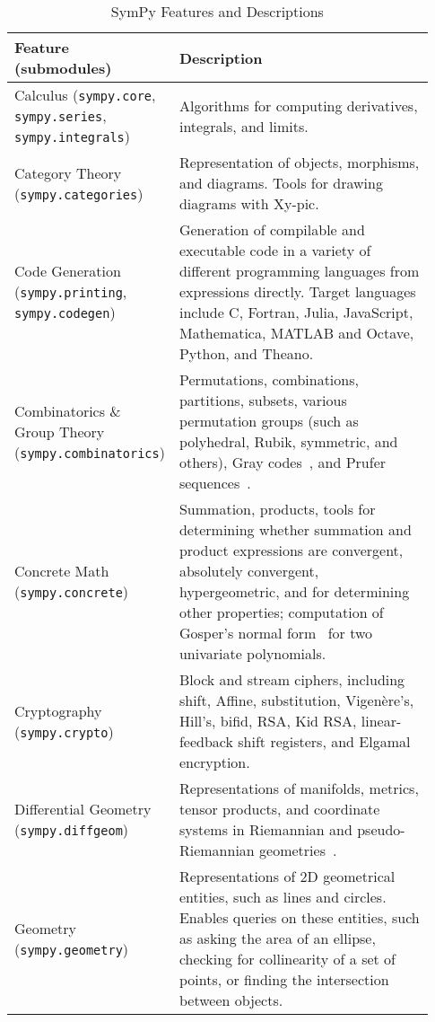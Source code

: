\begin{longtable}[htbc]{>{\raggedright}p{0.30\linewidth}p{0.63\linewidth}}
\caption{SymPy Features and Descriptions\label{features-table}}\\
\toprule
\textbf{Feature (submodules)} & \textbf{Description} \\
\midrule
Calculus (\texttt{sympy.core}, \texttt{sympy.series}, \texttt{sympy.integrals}) & Algorithms for computing derivatives, integrals, and limits.\\

Category Theory (\texttt{sympy.categories}) & Representation of objects, morphisms, and diagrams. Tools
for drawing diagrams with Xy-pic.\\

Code Generation (\texttt{sympy.printing}, \texttt{sympy.codegen}) & Generation of compilable and executable code in a
variety of different programming languages from expressions directly. Target
languages include C, Fortran, Julia, JavaScript,
Mathematica, MATLAB and Octave, Python, and Theano.\\

Combinatorics \& Group Theory (\texttt{sympy.combinatorics}) & Permutations, combinations,
partitions, subsets, various permutation groups (such as polyhedral, Rubik,
symmetric, and others), Gray codes~\cite{Nijenhuis1978combinatorial},
and Prufer sequences~\cite{biggs1976graph}.\\

Concrete Math (\texttt{sympy.concrete}) & Summation, products, tools for determining whether summation
and product expressions are convergent, absolutely convergent, hypergeometric,
and for determining other properties; computation of Gosper's normal form~\cite{petkovvsek1996bak} for two univariate polynomials.\\

Cryptography (\texttt{sympy.crypto}) & Block and stream ciphers, including shift, Affine,
substitution, Vigen\`{e}re's, Hill's, bifid, RSA, Kid RSA,
linear-feedback shift registers, and Elgamal encryption.\\

Differential Geometry (\texttt{sympy.diffgeom}) & Representations of manifolds, metrics, tensor
products, and coordinate systems in Riemannian and pseudo-Riemannian
geometries~\cite{FunctionalDifferentialGeometry}.\\

Geometry (\texttt{sympy.geometry}) & Representations of 2D geometrical entities, such as lines and
circles. Enables queries on these entities, such as asking the area of an
ellipse, checking for collinearity of a set of
points, or finding the intersection between objects.\\


\end{longtable}
